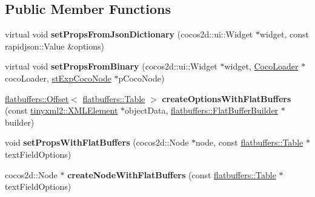 \subsection*{Public Member Functions}
\begin{DoxyCompactItemize}
\item 
\mbox{\label{classcocostudio_1_1TextFieldReader_a12dcb82f6b12ae690a367d4e1476ea37}} 
virtual void {\bfseries set\+Props\+From\+Json\+Dictionary} (cocos2d\+::ui\+::\+Widget $\ast$widget, const rapidjson\+::\+Value \&options)
\item 
\mbox{\label{classcocostudio_1_1TextFieldReader_a9bd26032bc77215da15c87c0ff2c0f60}} 
virtual void {\bfseries set\+Props\+From\+Binary} (cocos2d\+::ui\+::\+Widget $\ast$widget, \hyperlink{classcocostudio_1_1CocoLoader}{Coco\+Loader} $\ast$coco\+Loader, \hyperlink{structcocostudio_1_1stExpCocoNode}{st\+Exp\+Coco\+Node} $\ast$p\+Coco\+Node)
\item 
\mbox{\label{classcocostudio_1_1TextFieldReader_a76879002929749fa3bc93e97a2c9c51e}} 
\hyperlink{structflatbuffers_1_1Offset}{flatbuffers\+::\+Offset}$<$ \hyperlink{classflatbuffers_1_1Table}{flatbuffers\+::\+Table} $>$ {\bfseries create\+Options\+With\+Flat\+Buffers} (const \hyperlink{classtinyxml2_1_1XMLElement}{tinyxml2\+::\+X\+M\+L\+Element} $\ast$object\+Data, \hyperlink{classflatbuffers_1_1FlatBufferBuilder}{flatbuffers\+::\+Flat\+Buffer\+Builder} $\ast$builder)
\item 
\mbox{\label{classcocostudio_1_1TextFieldReader_a018c081b257755abaad292b9f29dc376}} 
void {\bfseries set\+Props\+With\+Flat\+Buffers} (cocos2d\+::\+Node $\ast$node, const \hyperlink{classflatbuffers_1_1Table}{flatbuffers\+::\+Table} $\ast$text\+Field\+Options)
\item 
\mbox{\label{classcocostudio_1_1TextFieldReader_a9f0d66a6ea4bf71ced20ea1b68489620}} 
cocos2d\+::\+Node $\ast$ {\bfseries create\+Node\+With\+Flat\+Buffers} (const \hyperlink{classflatbuffers_1_1Table}{flatbuffers\+::\+Table} $\ast$text\+Field\+Options)
\item 
\mbox{\label{classcocostudio_1_1TextFieldReader_a12dcb82f6b12ae690a367d4e1476ea37}} 

\end{DoxyCompactItemize}
